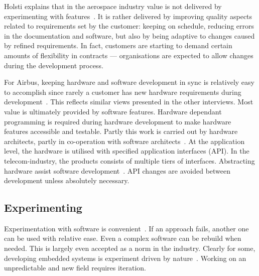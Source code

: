 \documentclass[english]{tktltiki2}
\begin{document}
Holsti explains that in the aerospace industry value is not delivered by experimenting with features~\cite{Hol15b}. It is rather delivered by improving quality aspects related to requirements set by the customer: keeping on schedule, reducing errors in the documentation and software, but also by being adaptive to changes caused by refined requirements. In fact, customers are starting to demand certain amounts of flexibility in contracts — organisations are expected to allow changes during the development process.

For Airbus, keeping hardware and software development in sync is relatively easy to accomplish since rarely a customer has new hardware requirements during development~\cite{Koi15}. This reflects similar views presented in the other interviews. Most value is ultimately provided by software features. Hardware dependant programming is required during hardware development to make hardware features accessible and testable. Partly this work is carried out by hardware architects, partly in co-operation with software architects~\cite{Koi15}. At the application level, the hardware is utilised with specified application interfaces (API). In the telecom-industry, the products consists of multiple tiers of interfaces. Abstracting hardware assist software development~\cite{Koi15}. API changes are avoided between development unless absolutely necessary.

\subsection{Experimenting}

Experimentation with software is convenient~\cite{Hol15a}. If an approach fails, another one can be used with relative ease. Even a complex software can be rebuild when needed. This is largely even accepted as a norm in the industry. Clearly for some, developing embedded systems is experiment driven by nature~\cite{Hol15a, Kri15}. Working on an unpredictable and new field requires iteration.
\end{document}

